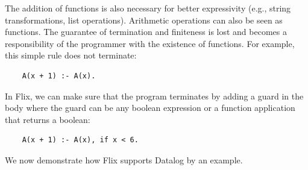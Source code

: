 \documentclass[11pt]{report}
\theoremstyle{definition}
\begin{document}
The addition of functions is also necessary for better expressivity (e.g., string transformations, list operations). Arithmetic operations can also be seen as functions. The guarantee of termination and finiteness is lost and becomes a responsibility of the programmer with the existence of functions. For example, this simple rule does not terminate:
\begin{verbatim}
    A(x + 1) :- A(x).
\end{verbatim}

In Flix, we can make sure that the program terminates by adding a guard in the body where the guard can be any boolean expression or a function application that returns a boolean:
\begin{verbatim}
    A(x + 1) :- A(x), if x < 6.
\end{verbatim}

We now demonstrate how Flix supports Datalog by an example.
\end{document}
